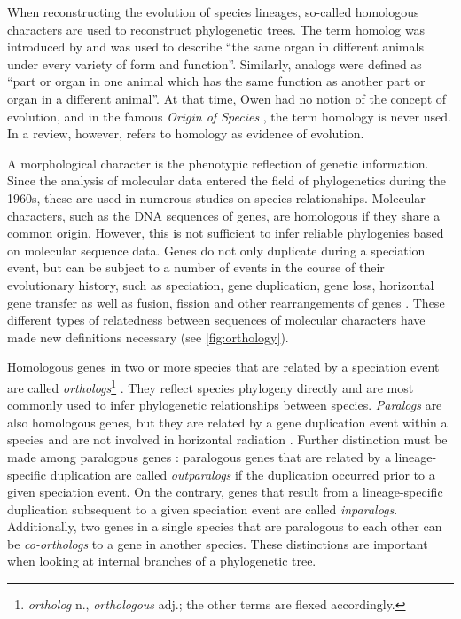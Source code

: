 When reconstructing the evolution of species lineages, so-called homologous
characters are used to reconstruct phylogenetic trees. The term homolog was
introduced by \citet{owen1848} and was used to describe ``the same organ in
different animals under every variety of form and function''. Similarly,
analogs were defined as ``part or organ in one animal which has the same
function as another part or organ in a different animal''. At that time, Owen
had no notion of the concept of evolution, and in the famous \emph{Origin of
Species} \citep{darwin1859}, the term homology is never used. In a review,
however, \citet{owen1860} refers to homology as evidence of evolution.

A morphological character is the phenotypic reflection of genetic information.
Since the analysis of molecular data entered the field of phylogenetics during
the 1960s, these are used in numerous studies on species relationships.
Molecular characters, such as the DNA sequences of genes, are homologous if they
share a common origin. However, this is not sufficient to infer reliable
phylogenies based on molecular sequence data. Genes do not only duplicate during
a speciation event, but can be subject to a number of events in the course of
their evolutionary history, such as speciation, gene duplication, gene loss,
horizontal gene transfer as well as fusion, fission and other rearrangements of
genes \citep{koonin2005}.  These different types of relatedness between
sequences of molecular characters have made new definitions necessary (see
\autoref{fig:orthology}).



Homologous genes in two or more species that are related by a speciation event
are called \emph{orthologs}\footnote{\emph{ortholog} n., \emph{orthologous}
adj.; the other terms are flexed accordingly.} \citep{fitch1970}. They reflect
species phylogeny directly and are most commonly used to infer phylogenetic
relationships between species. \emph{Paralogs} are also homologous genes, but
they are related by a gene duplication event within a species and are not
involved in horizontal radiation \citep{ohno1970}. Further distinction must be
made among paralogous genes \citep{remm2001}: paralogous genes that are related
by a lineage-specific duplication are called \emph{outparalogs} if the
duplication occurred prior to a given speciation event. On the contrary, genes
that result from a lineage-specific duplication subsequent to a given speciation
event are called \emph{inparalogs}. Additionally, two genes in a single species
that are paralogous to each other can be \emph{co-orthologs} to a gene in
another species. These distinctions are important when looking at internal
branches of a phylogenetic tree. 

